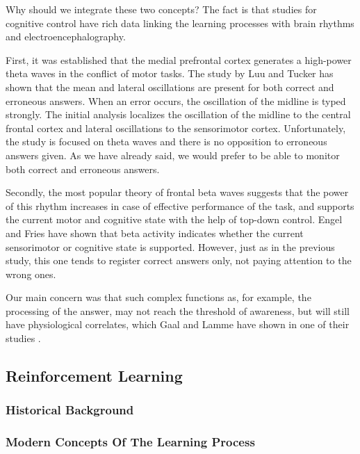 \documentclass[14pt,a4paper]{scrartcl}
\begin{document}
Why should we integrate these two concepts? The fact is that studies for cognitive control have rich data linking the learning processes with brain rhythms and electroencephalography.

First, it was established that the medial prefrontal cortex generates a high-power theta waves in the conflict of motor tasks. The study by Luu and Tucker \cite{Luu2001} has shown that the mean and lateral oscillations are present for both correct and erroneous answers. When an error occurs, the oscillation of the midline is typed strongly. The initial analysis localizes the oscillation of the midline to the central frontal cortex and lateral oscillations to the sensorimotor cortex. Unfortunately, the study is focused on theta waves and there is no opposition to erroneous answers given. As we have already said, we would prefer to be able to monitor both correct and erroneous answers.

Secondly, the most popular theory of frontal beta waves suggests that the power of this rhythm increases in case of effective performance of the task, and supports the current motor and cognitive state with the help of top-down control. Engel and Fries \cite{Engel2010} have shown that beta activity indicates whether the current sensorimotor or cognitive state is supported. However, just as in the previous study, this one tends to register correct answers only, not paying attention to the wrong ones.

Our main concern was that such complex functions as, for example, the processing of the answer, may not reach the threshold of awareness, but will still have physiological correlates, which Gaal and Lamme have shown in one of their studies \cite{VanGaal2012}.

\subsection{Reinforcement Learning}
\label{sec:Hypothesis:Reinforcement Learning}

\subsubsection{Historical Background}
\label{sec:Hypothesis:Learning Process:Historical Background}

\subsubsection{Modern Concepts Of The Learning Process}
\label{sec:Hypothesis:Learning Process:Modern Concepts Of The Learning Process}
\end{document}
